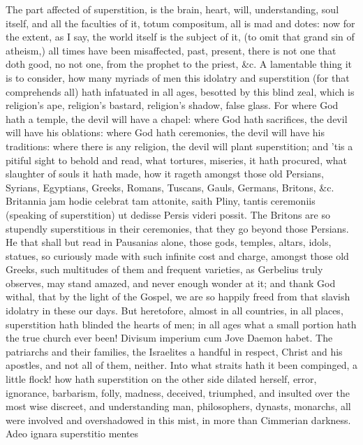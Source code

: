 {The part affected of superstition, is the brain, heart, will,
understanding, soul itself, and all the faculties of it, totum
compositum, all is mad and dotes: now for the extent, as I say, the
world itself is the subject of it, (to omit that grand sin of atheism,)
all times have been misaffected, past, present, there is not one that
doth good, no not one, from the prophet to the priest, \&c. A lamentable
thing it is to consider, how many myriads of men this idolatry and
superstition (for that comprehends all) hath infatuated in all ages,
besotted by this blind zeal, which is religion's ape, religion's
bastard, religion's shadow, false glass. For where God hath a temple,
the devil will have a chapel: where God hath sacrifices, the devil will
have his oblations: where God hath ceremonies, the devil will have his
traditions: where there is any religion, the devil will plant
superstition; and 'tis a pitiful sight to behold and read, what
tortures, miseries, it hath procured, what slaughter of souls it hath
made, how it rageth amongst those old Persians, Syrians, Egyptians,
Greeks, Romans, Tuscans, Gauls, Germans, Britons, \&c. Britannia jam
hodie celebrat tam attonite, saith Pliny, tantis ceremoniis
(speaking of superstition) ut dedisse Persis videri possit. The Britons
are so stupendly superstitious in their ceremonies, that they go beyond
those Persians. He that shall but read in Pausanias alone, those gods,
temples, altars, idols, statues, so curiously made with such infinite
cost and charge, amongst those old Greeks, such multitudes of them and
frequent varieties, as Gerbelius truly observes, may stand
amazed, and never enough wonder at it; and thank God withal, that by
the light of the Gospel, we are so happily freed from that slavish
idolatry in these our days. But heretofore, almost in all countries, in
all places, superstition hath blinded the hearts of men; in all ages
what a small portion hath the true church ever been! Divisum imperium
cum Jove Daemon habet. The patriarchs and their families, the
Israelites a handful in respect, Christ and his apostles, and not all
of them, neither. Into what straits hath it been compinged, a little
flock! how hath superstition on the other side dilated herself, error,
ignorance, barbarism, folly, madness, deceived, triumphed, and insulted
over the most wise discreet, and understanding man, philosophers,
dynasts, monarchs, all were involved and overshadowed in this mist, in
more than Cimmerian darkness. Adeo ignara superstitio mentes
}
